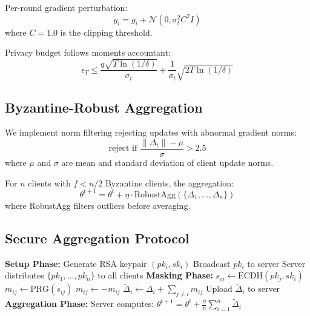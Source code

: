 \documentclass[conference]{IEEEtran}
\begin{document}
Per-round gradient perturbation:
\begin{equation}
\tilde{g}_i = g_i + \mathcal{N}(0, \sigma_t^2 C^2 I)
\end{equation}
where $C=1.0$ is the clipping threshold.

Privacy budget follows moments accountant:
\begin{equation}
\epsilon_T \leq \frac{q\sqrt{T\ln(1/\delta)}}{\sigma_t} + \frac{1}{\sigma_t}\sqrt{2T\ln(1/\delta)}
\end{equation}

\subsection{Byzantine-Robust Aggregation}

We implement norm filtering rejecting updates with abnormal gradient norms:
\begin{equation}
\text{reject if } \frac{\|\Delta_i\| - \mu}{\sigma} > 2.5
\end{equation}
where $\mu$ and $\sigma$ are mean and standard deviation of client update norms.

For $n$ clients with $f < n/2$ Byzantine clients, the aggregation:
\begin{equation}
\theta^{t+1} = \theta^t + \eta \cdot \text{RobustAgg}(\{\Delta_1, \ldots, \Delta_n\})
\end{equation}
where RobustAgg filters outliers before averaging.

\subsection{Secure Aggregation Protocol}

\begin{algorithm}[t]
\caption{Secure Aggregation with Pairwise Masking}
\begin{algorithmic}[1]
\STATE \textbf{Setup Phase:}
    \STATE Generate RSA keypair $(pk_i, sk_i)$
    \STATE Broadcast $pk_i$ to server
\ENDFOR
\STATE Server distributes $\{pk_1, \ldots, pk_n\}$ to all clients
\STATE
\STATE \textbf{Masking Phase:}
        \STATE $s_{ij} \leftarrow \text{ECDH}(pk_j, sk_i)$
        \STATE $m_{ij} \leftarrow \text{PRG}(s_{ij})$
            \STATE $m_{ij} \leftarrow -m_{ij}$ 
        \ENDIF
    \ENDFOR
    \STATE $\tilde{\Delta}_i \leftarrow \Delta_i + \sum_{j \neq i} m_{ij}$
    \STATE Upload $\tilde{\Delta}_i$ to server
\ENDFOR
\STATE
\STATE \textbf{Aggregation Phase:}
\STATE Server computes: $\theta^{t+1} = \theta^t + \frac{\eta}{n}\sum_{i=1}^n \tilde{\Delta}_i$
\STATE {}
\end{algorithmic}
\end{algorithm}
\end{document}
